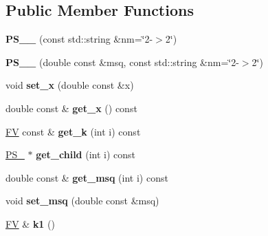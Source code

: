\subsection*{Public Member Functions}
\begin{DoxyCompactItemize}
\item 
\hypertarget{classPS__2__1_abdf4e57ac00768c463aa0f25ca8eaa55}{{\bfseries P\-S\-\_\-\_} (const std\-::string \&nm=\char`\"{}2-\/$>$2\char`\"{})}\label{classPS__2__1_abdf4e57ac00768c463aa0f25ca8eaa55}

\item 
\hypertarget{classPS__2__1_a5f6b4ede135f7decfad67cafa2be6a1f}{{\bfseries P\-S\-\_\-\_} (double const \&msq, const std\-::string \&nm=\char`\"{}2-\/$>$2\char`\"{})}\label{classPS__2__1_a5f6b4ede135f7decfad67cafa2be6a1f}

\item 
\hypertarget{classPS__2__1_a85f554f63cdd77eb9e961f21dc8a5025}{void {\bfseries set\-\_\-x} (double const \&x)}\label{classPS__2__1_a85f554f63cdd77eb9e961f21dc8a5025}

\item 
\hypertarget{classPS__2__1_ae61b15b9a11d358ab1db760a68d29a48}{double const \& {\bfseries get\-\_\-x} () const }\label{classPS__2__1_ae61b15b9a11d358ab1db760a68d29a48}

\item 
\hypertarget{classPS__2__1_ad6834a4e1e1b0e7081020d9c93fce803}{\hyperlink{classFV}{F\-V} const \& {\bfseries get\-\_\-k} (int i) const }\label{classPS__2__1_ad6834a4e1e1b0e7081020d9c93fce803}

\item 
\hypertarget{classPS__2__1_ac47a7de9d93c165993b96aeb6d8b51a9}{\hyperlink{classPS__2}{P\-S\-\_} $\ast$ {\bfseries get\-\_\-child} (int i) const }\label{classPS__2__1_ac47a7de9d93c165993b96aeb6d8b51a9}

\item 
\hypertarget{classPS__2__1_ac1ebcf6777ab799e9c56f90ec6bd0d63}{double const \& {\bfseries get\-\_\-msq} (int i) const }\label{classPS__2__1_ac1ebcf6777ab799e9c56f90ec6bd0d63}

\item 
\hypertarget{classPS__2__1_ad3a493e3ccbb2b98c6e74131ba62d840}{void {\bfseries set\-\_\-msq} (double const \&msq)}\label{classPS__2__1_ad3a493e3ccbb2b98c6e74131ba62d840}

\item 
\hypertarget{classPS__2__1_a0c349c6d76745bf8c345b6193b4a382a}{\hyperlink{classFV}{F\-V} \& {\bfseries k1} ()}\label{classPS__2__1_a0c349c6d76745bf8c345b6193b4a382a}


\end{DoxyCompactItemize}
